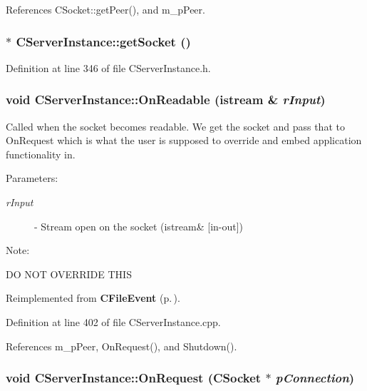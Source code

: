 References CSocket::get\-Peer(), and m\_\-p\-Peer.
\subsubsection{$\ast$ CServer\-Instance::get\-Socket ()\hspace{0.3cm}{\tt  [inline]}}\label{classCServerInstance_a4}




Definition at line 346 of file CServer\-Instance.h.
\subsubsection{\setlength{\rightskip}{0pt plus 5cm}void CServer\-Instance::On\-Readable (istream \& {\em r\-Input})\hspace{0.3cm}{\tt  [virtual]}}\label{classCServerInstance_a8}


Called when the socket becomes readable. We get the socket and pass that to On\-Request which is what the user is supposed to override and embed application functionality in.\begin{Desc}
\item[Parameters: ]\par
\begin{description}
\item[{\em 
r\-Input}]- Stream open on the socket (istream\& [in-out])\end{description}
\end{Desc}
\begin{Desc}
\item[Note: ]\par
DO NOT OVERRIDE THIS \end{Desc}


Reimplemented from {\bf CFile\-Event} {\rm (p.\,\pageref{classCFileEvent_a15})}.

Definition at line 402 of file CServer\-Instance.cpp.

References m\_\-p\-Peer, On\-Request(), and Shutdown().
\subsubsection{\setlength{\rightskip}{0pt plus 5cm}void CServer\-Instance::On\-Request ({\bf CSocket} $\ast$ {\em p\-Connection})\hspace{0.3cm}{\tt  [virtual]}}\label{classCServerInstance_a9}


